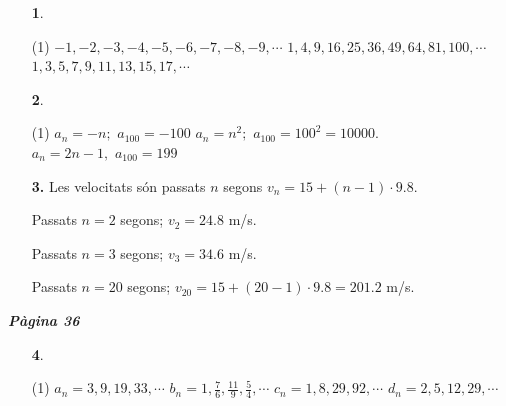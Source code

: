 \documentclass[a4paper, pdf, twoside]{book}
\begin{document}
\begin{multicols}{2}
\begin{enumerate}

 \item[\fontfamily{phv}\selectfont\color{blue}\textbf{1}. ] 
 \begin{tasks}[column-sep=1em, item-indent=1.3333em](1)
	 \task* $-1,-2,-3,-4,-5,-6,-7,-8,-9,\cdots $
	 \task* $1,4,9,16,25,36,49,64,81,100,\cdots $
	 \task* $1,3,5,7,9,11,13,15,17,\cdots $
\end{tasks}
 \end{enumerate}
\begin{enumerate}
\vspace{0.25cm}



 \item[\fontfamily{phv}\selectfont\color{blue}\textbf{2}. ] 
 \begin{tasks}[column-sep=1em, item-indent=1.3333em](1)
	 \task $a_n=-n;\,\,a_{100}=-100$
	 \task* $a_n=n^2;\,\,a_{100}=100^2=10000$. $a_n=2n-1,\,\,a_{100}=199$
\end{tasks}
\vspace{0.25cm}
\item[\fontfamily{phv}\selectfont\color{blue}\textbf{3. }] 
Les velocitats són passats $n$ segons $v_n=15+(n-1)\cdot 9.8$.\par Passats $n=2$ segons; $v_2=24.8$ m/s. \par Passats $n=3$ segons; $v_3=34.6$ m/s. \par Passats $n=20$ segons; $v_{20}=15+(20-1)\cdot 9.8=201.2$ m/s.
 \end{enumerate}
\vspace{0.3cm}


{\textbf{\em Pàgina 36}} \hrulefill
\begin{enumerate}
\vspace{0.25cm}



 \item[\fontfamily{phv}\selectfont\color{blue}\textbf{4}. ] 
 \begin{tasks}[column-sep=1em, item-indent=1.3333em](1)
	 \task $a_n=3,9,19,33,\cdots $
	 \task* $b_n=1,\frac {7}{6},\frac {11}{9},\frac {5}{4},\cdots $
	 \task $c_n=1,8,29,92,\cdots $
	 \task $d_n=2,5,12,29,\cdots $
\end{tasks}
 \end{enumerate}
\begin{enumerate}
\vspace{0.25cm}



\end{enumerate}
\end{multicols}
\end{document}

